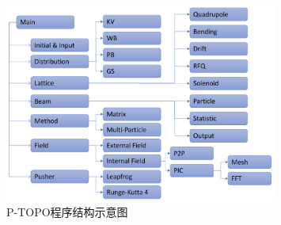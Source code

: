 \begin{figure}[!htb]
    \centering
    \includegraphics[width=0.8\textwidth]{Img/P_TOPO.pdf}
    \caption{P-TOPO程序结构示意图}
    \label{fig:P_TOPO}
\end{figure}

